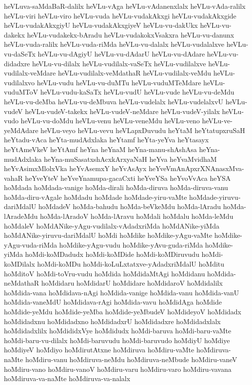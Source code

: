 {heVLuva-saMdaBaR-dalilx
heVLu-vAga
heVLu-vAdanenxlalx
heVLu-vAda-ralilx
heVLu-viri
heVLu-viro
heVLu-vuda
heVLu-vudakAkxgi
heVLu-vudakAkxgide
heVLu-vudakAkxgiyU
heVLu-vudakAkxgiyeV
heVLu-vu-dakUkx
heVLu-vu-dakekx
heVLu-vudakekx-bAradu
heVLu-vudakokxVsakxra
heVLu-vu-danunx
heVLu-vuda-ralilx
heVLu-vuda-riMda
heVLu-vu-dalalx
heVLu-vudalalxve
heVLu-vu-daSeTx
heVLu-vu-dAgiyU
heVLu-vu-dAdarU
heVLu-vu-dAdare
heVLu-vu-didadxre
heVLu-vu-dilalx
heVLu-vudilalx-vaSeTx
heVLu-vudilalxve
heVLu-vudilalx-veMdare
heVLu-vudilalx-veMdathaR
heVLu-vudilalx-veMdu
heVLu-vudilalxvo
heVLu-vudu
heVLu-vu-duMTu
heVLu-vuduMTeMdare
heVLu-vuduMToV
heVLu-vudu-kaSaTx
heVLu-vudU
heVLu-vude
heVLu-vu-deMdu
heVLu-vu-deMba
heVLu-vu-deMbuva
heVLu-vudelalx
heVLu-vudelalxvU
heVLu-vudeV
heVLu-vudeV-takekx
heVLu-vudeV-neMdare
heVLu-vudeV-yilalx
heVLu-vudo
heVLu-vu-doMdu
heVLu-venu
heVLu-veneMdu
heVLu-veno
heVLu-ve-yeMdAdare
heVLu-veyo
heVLu-vevu
heVLapxDuvudu
heYtaM
heYtatupxruSaH
heYtadu-vAca
heYta-mudAdxlaka
heYtamf
heYta-yeYva
heYtasayx
heYtAmeVkeV
heYtAmf
heYna
heYnaM
heYna-manu-shAshAsa
heYna-mudAdxlaka
heYna-muSasatxshAcxkArxyaNaH
heYva
heYvaMvidhaM
heYvAsimxMlolxVka
heYvAsemxY
heYvAsAyx
heYveVmAnApxrXNAnasxMva-vahaR
heYveYteV
heYveYnamupa-gacaCxti
heYveYSa
heYvoVvAca
heYSA
hoMdada
hoMdada-vanige
hoMda-dirali
hoMda-diruva
hoMda-diruva-vanu
hoMda-diru-vAgale
hoMdadu
hoMdade
hoMdade-yiru-vaMte
hoMdade-yiruvu-dariMdalU
hoMdadeV
hoMda-bahudu
hoMda-beVkeMdu
hoMda-lAradu
hoMda-lAradeMdu
hoMda-lAradoV
hoMda-lAravu
hoMdali
hoMdalu
hoMda-leMdu
hoMdaleV
hoMdANike-yAgu-vudilalx-vAdadxriMda
hoMdANike-yiMda
hoMdANike-yiruvu-dariMdalU
hoMdi
hoMdike
hoMdike-yAgu-vaMte
hoMdike-yAgu-vuda-riMda
hoMdike-yAgu-vudu
hoMdike-yAvu-guda-riMda
hoMdike-yiMda
hoMdi-koMDadudx
hoMdi-koMDide
hoMdi-koMDiruvudu
hoMdi-koMDilalx
hoMdi-koMDu
hoMdi-koLuLxtatxve-yAdadxriMdalU
hoMditu
hoMditoV
hoMdi-toVru-vudu
hoMdida
hoMdidaMtAgi
hoMdidanu
hoMdida-neMdathaR
hoMdidaru
hoMdidarU
hoMdidare
hoMdidaroV
hoMdidalilx
hoMdida-vana
hoMdidava-nAgi
hoMdida-vanige
hoMdida-vanu
hoMdida-vanU
hoMdida-vaneMdU
hoMdidava-rAgi
hoMdida-vavu
hoMdidAga
hoMdide
hoMdide-yeMdu
hoMdide-yeMba
hoMdide-yeMbudeV
hoMdideyoV
hoMdidadx
hoMdidadxnu
hoMdidadxno
hoMdidadxrU
hoMdidadxre
hoMdidadxlalx
hoMdidadxlilx
hoMdididxVye
hoMdidudx
hoMdi-baruva
hoMdi-baru-vaMte
hoMdi-baru-vu-dilalx
hoMdi-baruvudu
hoMdi-baruvudo
hoMdiyU
hoMdiye
hoMdiyeV
hoMdiyo
hoMdirutAtxne
hoMdiruva
hoMdiru-vaMte
hoMdiruva-naMte
hoMdiru-vanu
hoMdiruva-neMdu
hoMdiruva-neMbude
hoMdiru-vaneV
hoMdiru-vano
hoMdiru-vanoV
hoMdiru-varu
hoMdiru-varo
hoMdiru-vavana
hoMdiruva-va-naMte
hoMdiruva-va-nalalx
}
